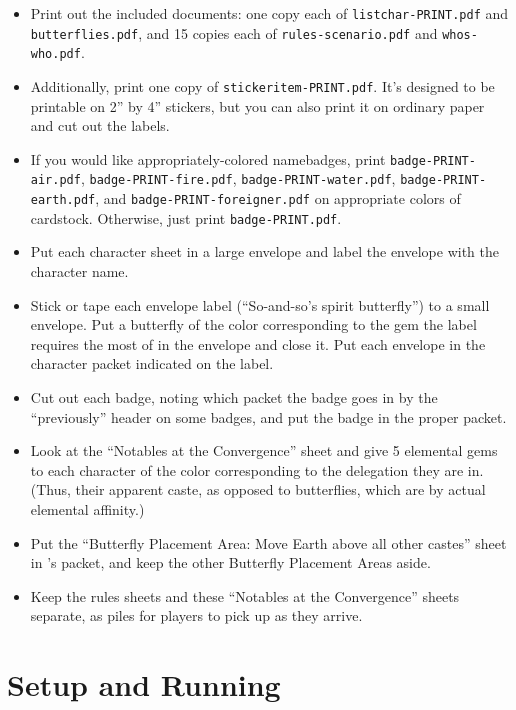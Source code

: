\documentclass[sheet]{iron}
\begin{document}
\begin{itemize}
\item Print out the included documents: one copy each of
  \texttt{listchar-PRINT.pdf} and
  \texttt{butterflies.pdf}, and 15 copies each of
  \texttt{rules-scenario.pdf} and \texttt{whos-who.pdf}.
\item Additionally, print one copy of
  \texttt{stickeritem-PRINT.pdf}. It's designed to be printable on
  2'' by 4'' stickers, but you can also print it on ordinary paper
  and cut out the labels.
\item If you would like appropriately-colored namebadges, print 
  \texttt{badge-PRINT-air.pdf}, 
  \texttt{badge-PRINT-fire.pdf}, 
  \texttt{badge-PRINT-water.pdf}, 
  \texttt{badge-PRINT-earth.pdf}, and
  \texttt{badge-PRINT-foreigner.pdf} on appropriate colors of cardstock.
  Otherwise, just print \texttt{badge-PRINT.pdf}.
\item Put each character sheet in a large envelope and label the
  envelope with the character name.
\item Stick or tape each envelope label (``So-and-so's spirit
  butterfly'') to a small envelope.  Put a butterfly of the color
  corresponding to the gem the label requires the most of in the
  envelope and close it.  Put each envelope in the character packet
  indicated on the label.
\item Cut out each badge, noting which packet the badge goes in by the
  ``previously'' header on some badges, and put the badge in the proper packet.
\item Look at the ``Notables at the Convergence'' sheet and give 5 elemental
  gems to each character of the color corresponding to the delegation they
  are in.  (Thus, their apparent caste, as opposed to butterflies, which
  are by actual elemental affinity.)
\item Put the ``Butterfly Placement Area: Move Earth above all other castes''
  sheet in \cRoyalty{\full}'s packet, and keep the other Butterfly Placement
  Areas aside.
\item Keep the rules sheets and these ``Notables at the Convergence'' sheets
  separate, as piles for players to pick up as they arrive.
\end{itemize}

\section{Setup and Running}
\end{document}
